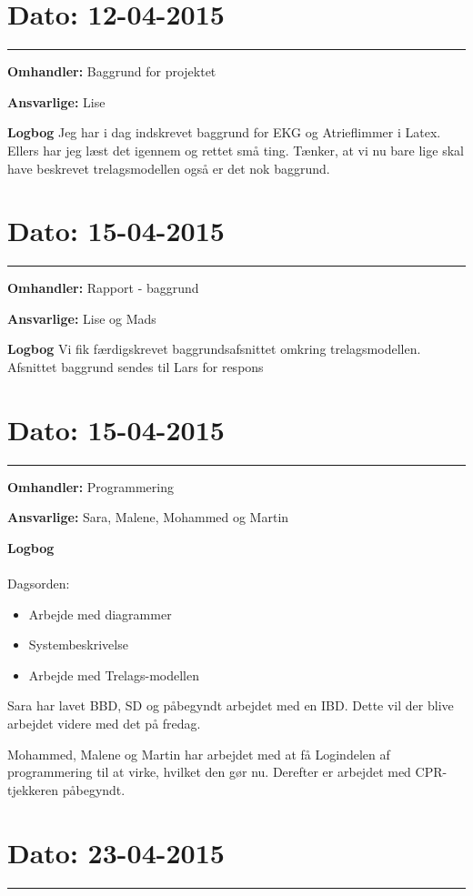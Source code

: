 \section{Dato: 12-04-2015}
\hrule 


\textbf{Omhandler:} Baggrund for projektet

\textbf{Ansvarlige:} Lise

\textbf{Logbog}
Jeg har i dag indskrevet baggrund for EKG og Atrieflimmer i Latex. Ellers har jeg læst det igennem og rettet små ting. 
Tænker, at vi nu bare lige skal have beskrevet trelagsmodellen også er det nok baggrund. 

\section{Dato: 15-04-2015}
\hrule

\textbf{Omhandler:} Rapport - baggrund

\textbf{Ansvarlige:} Lise og Mads

\textbf{Logbog}
Vi fik færdigskrevet baggrundsafsnittet omkring trelagsmodellen. Afsnittet baggrund sendes til Lars for respons

\section{Dato: 15-04-2015}
\hrule

\textbf{Omhandler:} Programmering

\textbf{Ansvarlige: }Sara, Malene, Mohammed og Martin 

\textbf{Logbog}
\\
\\
Dagsorden:
\begin{itemize}
\item Arbejde med diagrammer
\item Systembeskrivelse
\item Arbejde med Trelags-modellen
\end{itemize}

Sara har lavet BBD, SD og påbegyndt arbejdet med
en IBD. Dette vil der blive arbejdet videre med det på fredag.

Mohammed, Malene og Martin har arbejdet med at få Logindelen af programmering til at virke, hvilket den gør nu. Derefter er arbejdet med CPR-tjekkeren påbegyndt.


\section{Dato: 23-04-2015}
\hrule 

